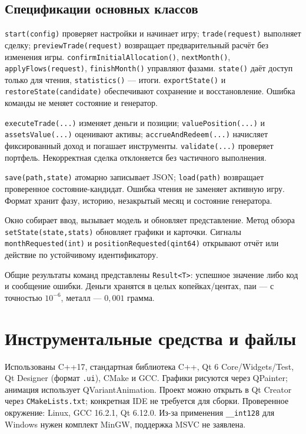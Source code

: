 \documentclass[11pt,a4paper]{article}
\newcommand{\code}[1]{\texttt{#1}}
\begin{document}
\subsection*{Спецификации основных классов}
\begin{description}[style=nextline]
\item[Simulation] \code{start(config)} проверяет настройки и начинает игру; \code{trade(request)} выполняет сделку; \code{previewTrade(request)} возвращает предварительный расчёт без изменения игры. \code{confirmInitialAllocation()}, \code{nextMonth()}, \code{applyFlows(request)}, \code{finishMonth()} управляют фазами. \code{state()} даёт доступ только для чтения, \code{statistics()} --- итоги. \code{exportState()} и \code{restoreState(candidate)} обеспечивают сохранение и восстановление. Ошибка команды не меняет состояние и генератор.
\item[Portfolio] \code{executeTrade(...)} изменяет деньги и позиции; \code{valuePosition(...)} и \code{assetsValue(...)} оценивают активы; \code{accrueAndRedeem(...)} начисляет фиксированный доход и погашает инструменты. \code{validate(...)} проверяет портфель. Некорректная сделка отклоняется без частичного выполнения.
\item[GameStorage] \code{save(path,state)} атомарно записывает JSON; \code{load(path)} возвращает проверенное состояние-кандидат. Ошибка чтения не заменяет активную игру. Формат хранит фазу, историю, незакрытый месяц и состояние генератора.
\item[MainWindow и DashboardWidget] Окно собирает ввод, вызывает модель и обновляет представление. Метод обзора \code{setState(state,stats)} обновляет графики и карточки. Сигналы \code{monthRequested(int)} и \code{positionRequested(qint64)} открывают отчёт или действие по устойчивому идентификатору.
\end{description}
Общие результаты команд представлены \code{Result<T>}: успешное значение либо код и сообщение ошибки. Деньги хранятся в целых копейках/центах, паи --- с точностью $10^{-6}$, металл --- $0{,}001$ грамма.

\newpage
\section{Инструментальные средства и файлы}
Использованы C++17, стандартная библиотека C++, Qt 6 Core/Widgets/Test, Qt Designer (формат \code{.ui}), CMake и GCC. Графики рисуются через QPainter; анимация использует QVariantAnimation. Проект можно открыть в Qt Creator через \code{CMakeLists.txt}; конкретная IDE не требуется для сборки. Проверенное окружение: Linux, GCC 16.2.1, Qt 6.12.0. Из-за применения \code{\_\_int128} для Windows нужен комплект MinGW, поддержка MSVC не заявлена.
\end{document}
